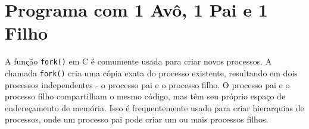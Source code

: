 \documentclass[
	12pt,				%
	openright,			%
	oneside,			%
	a4paper,			%
	chapter=TITLE,		%
	english,			%
	french,				%
	spanish,			%
	brazil				%
	]{abntex2}
\theoremstyle{definition}
\begin{document}

\section{Programa com 1 Avô, 1 Pai e 1 Filho}


A função \texttt{fork()} em C é comumente usada para criar novos processos. 
A chamada \texttt{fork()} cria uma cópia exata do processo existente, 
resultando em dois processos independentes - o processo pai e o processo filho. 
O processo pai e o processo filho compartilham o mesmo código, mas têm 
seu próprio espaço de endereçamento de memória. Isso é frequentemente usado 
para criar hierarquias de processos, onde um processo pai pode criar um ou 
mais processos filhos.
\end{document}
